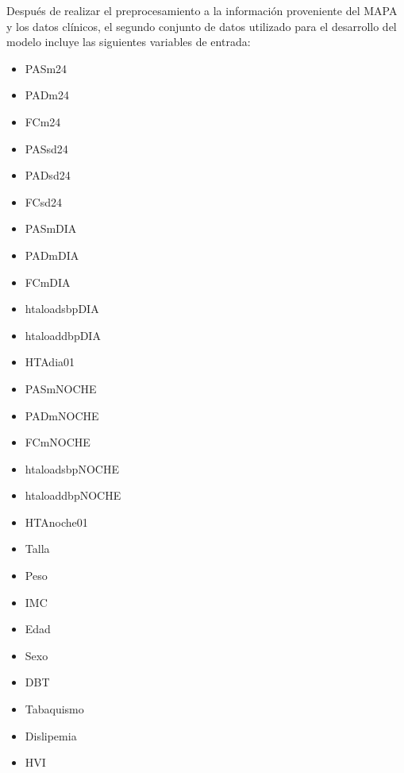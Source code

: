 Después de realizar el preprocesamiento a la información proveniente del MAPA y los datos clínicos, el segundo conjunto de 
datos utilizado para el desarrollo del modelo incluye las siguientes variables de entrada:

\begin{itemize}
  \item PASm24	
  \item PADm24
  \item FCm24
  \item PASsd24 
  \item PADsd24
  \item FCsd24
  \item PASmDIA
  \item PADmDIA
  \item FCmDIA
  \item htaloadsbpDIA 
  \item htaloaddbpDIA   
  \item HTAdia01	
  \item PASmNOCHE
  \item PADmNOCHE
  \item FCmNOCHE
  \item htaloadsbpNOCHE
  \item htaloaddbpNOCHE
  \item HTAnoche01
  \item Talla
  \item Peso
  \item IMC
  \item Edad
  \item Sexo
  \item DBT
  \item Tabaquismo
  \item Dislipemia
  \item HVI
\end{itemize}
